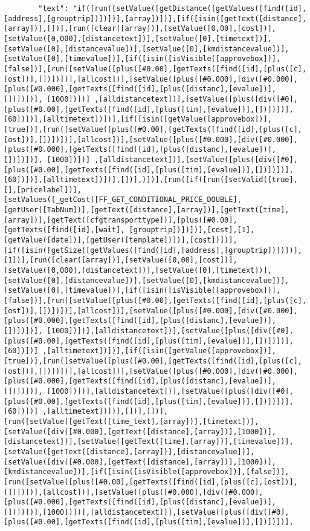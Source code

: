 \documentclass[../index.tex]{subfiles}
\begin{document}
\begin{verbatim}
        "text": "if([run([setValue([getDistance([getValues([find([id],[address],[grouptrip])])])],[array])])],[if([isin([getText([distance],[array])],[])],[run([clear([array])],[setValue([0,00],[cost])],[setValue([0,000],[distancetext])],[setValue([0],[timetext])],[setValue([0],[distancevalue])],[setValue([0],[kmdistancevalue])],[setValue([0],[timevalue])],[if([isin([isVisible([approvebox])],[false])],[run([setValue([plus([#0.00],[getTexts([find([id],[plus([c],[ost])],[])])])],[allcost])],[setValue([plus([#0.000],[div([#0.000], [plus([#0.000],[getTexts([find([id],[plus([distanc],[evalue])],[])])])], [1000])])] ,[alldistancetext])],[setValue([plus([div([#0], [plus([#0.00],[getTexts([find([id],[plus([tim],[evalue])],[])])])], [60])])],[alltimetext])])],[if([isin([getValue([approvebox])],[true])],[run([setValue([plus([#0.00],[getTexts([find([id],[plus([c],[ost])],[])])])],[allcost])],[setValue([plus([#0.000],[div([#0.000], [plus([#0.000],[getTexts([find([id],[plus([distanc],[evalue])],[])])])], [1000])])] ,[alldistancetext])],[setValue([plus([div([#0], [plus([#0.00],[getTexts([find([id],[plus([tim],[evalue])],[])])])], [60])])],[alltimetext])])],[])],)])],[run([if([run([setValid([true],[],[pricelabel])],[setValues([_getCost([FF_GET_CONDITIONAL_PRICE_DOUBLE],[getUser([TabNum])],[getText([distance],[array])],[getText([time],[array])],[getText([cfgtransporttype])],[plus([#0.00],[getTexts([find([id],[wait], [grouptrip])])])],[cost],[1],[getValue([date])],[getUser([template])])],[cost])])],[if([isin([getSize([getValues([find([id],[address],[grouptrip])])])],[1])],[run([clear([array])],[setValue([0,00],[cost])],[setValue([0,000],[distancetext])],[setValue([0],[timetext])],[setValue([0],[distancevalue])],[setValue([0],[kmdistancevalue])],[setValue([0],[timevalue])],[if([isin([isVisible([approvebox])],[false])],[run([setValue([plus([#0.00],[getTexts([find([id],[plus([c],[ost])],[])])])],[allcost])],[setValue([plus([#0.000],[div([#0.000], [plus([#0.000],[getTexts([find([id],[plus([distanc],[evalue])],[])])])], [1000])])],[alldistancetext])],[setValue([plus([div([#0], [plus([#0.00],[getTexts([find([id],[plus([tim],[evalue])],[])])])], [60])])] ,[alltimetext])])],[if([isin([getValue([approvebox])],[true])],[run([setValue([plus([#0.00],[getTexts([find([id],[plus([c],[ost])],[])])])],[allcost])],[setValue([plus([#0.000],[div([#0.000], [plus([#0.000],[getTexts([find([id],[plus([distanc],[evalue])],[])])])], [1000])])],[alldistancetext])],[setValue([plus([div([#0], [plus([#0.00],[getTexts([find([id],[plus([tim],[evalue])],[])])])], [60])])] ,[alltimetext])])],[])],)])],[run([setValue([getText([time_text],[array])],[timetext])],[setValue([div([#0.000],[getText([distance],[array])],[1000])],[distancetext])],[setValue([getText([time],[array])],[timevalue])],[setValue([getText([distance],[array])],[distancevalue])],[setValue([div([#0.000],[getText([distance],[array])],[1000])],[kmdistancevalue])],[if([isin([isVisible([approvebox])],[false])],[run([setValue([plus([#0.00],[getTexts([find([id],[plus([c],[ost])],[])])])],[allcost])],[setValue([plus([#0.000],[div([#0.000],[plus([#0.000],[getTexts([find([id],[plus([distanc],[evalue])],[])])])],[1000])])],[alldistancetext])],[setValue([plus([div([#0],[plus([#0.00],[getTexts([find([id],[plus([tim],[evalue])],[])])])], 
\end{verbatim}
\end{document}
